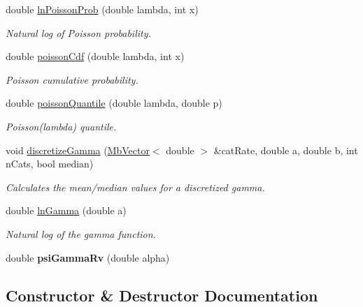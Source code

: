 \begin{DoxyCompactItemize}
double \mbox{\hyperlink{class_mb_random_a9d842b9c60ccd77094cfe97b53fd205c}{ln\+Poisson\+Prob}} (double lambda, int x)
\begin{DoxyCompactList}\small\item\em Natural log of Poisson probability. \end{DoxyCompactList}\item 
double \mbox{\hyperlink{class_mb_random_adb0a8b9aa025f68a6ef519581c28d37b}{poisson\+Cdf}} (double lambda, int x)
\begin{DoxyCompactList}\small\item\em Poisson cumulative probability. \end{DoxyCompactList}\item 
double \mbox{\hyperlink{class_mb_random_afe0079c445520c19cfda7f03131acf46}{poisson\+Quantile}} (double lambda, double p)
\begin{DoxyCompactList}\small\item\em Poisson(lambda) quantile. \end{DoxyCompactList}\item 
void \mbox{\hyperlink{class_mb_random_ab8f819e7f62ab1c2b1f165b2d3efe315}{discretize\+Gamma}} (\mbox{\hyperlink{class_mb_vector}{Mb\+Vector}}$<$ double $>$ \&cat\+Rate, double a, double b, int n\+Cats, bool median)
\begin{DoxyCompactList}\small\item\em Calculates the mean/median values for a discretized gamma. \end{DoxyCompactList}\item 
double \mbox{\hyperlink{class_mb_random_ae27b57bf2122981b6c589b6f39d0cf6c}{ln\+Gamma}} (double a)
\begin{DoxyCompactList}\small\item\em Natural log of the gamma function. \end{DoxyCompactList}\item 
\mbox{\label{class_mb_random_a4e0d16a617cfe4bddf892748b4860661}} 
double {\bfseries psi\+Gamma\+Rv} (double alpha)
\end{DoxyCompactItemize}


\subsection{Constructor \& Destructor Documentation}
\mbox{\label{class_mb_random_a93258da000d2831829903edc33c4d09c}} 
